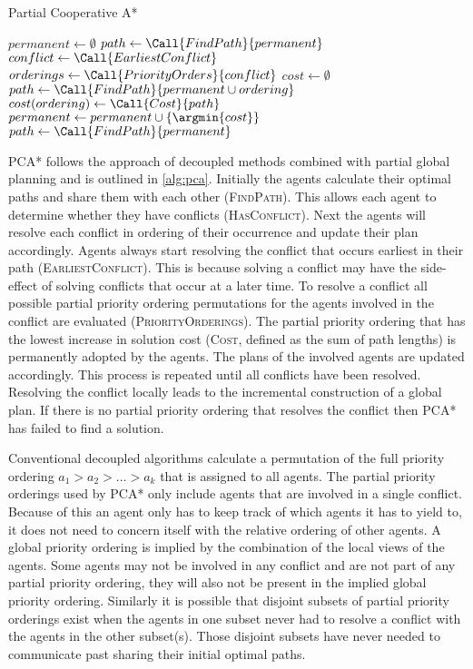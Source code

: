 \begin{algorithm}[t]
	\caption{Partial Cooperative A*}
	\label{alg:pca}
	\begin{algorithmic}[1]
		\State $permanent \gets \emptyset$
		\State $path \gets \Call{FindPath}{permanent}$
			\State $conflict \gets \Call{EarliestConflict}$
			\State $orderings \gets \Call{PriorityOrders}{conflict}$ 
			\State $cost \gets \emptyset$
				\State $path \gets \Call{FindPath}{permanent \cup ordering}$
				\State $cost(ordering) \gets \Call{Cost}{path}$
			\EndFor
			\State $permanent \gets permanent \cup \{ \argmin{cost} \}$
			\State $path \gets \Call{FindPath}{permanent}$
		\EndWhile
	\end{algorithmic}
\end{algorithm}

PCA* follows the approach of decoupled methods combined with partial 
global planning and is outlined in \autoref{alg:pca}. Initially the agents 
calculate their optimal paths and share them with each other (\textsc{FindPath}). This allows
each agent to determine whether they have conflicts (\textsc{HasConflict}). Next the
agents will resolve each conflict in ordering of their occurrence and update 
their 
plan accordingly. Agents always start resolving the conflict that occurs earliest in their path (\textsc{EarliestConflict}). This is because solving a conflict may have the 
side-effect of solving conflicts that occur at a later time. To resolve a 
conflict all possible partial priority ordering permutations for the agents 
involved in the conflict are evaluated (\textsc{PriorityOrderings}). The partial priority ordering that has 
the 
lowest increase in solution cost (\textsc{Cost}, defined as the sum of path lengths) is permanently adopted 
by the agents. The plans of the involved agents are updated accordingly. This 
process is repeated until all conflicts have been resolved. Resolving the 
conflict locally leads to the incremental construction of a global plan. If 
there is no partial priority ordering that resolves the conflict then PCA* has 
failed to find a solution.

Conventional decoupled algorithms calculate a permutation of the full priority 
ordering $a_1 > a_2 > \ldots > a_k$ that is assigned to all agents. The partial 
priority orderings used by PCA* only include agents that are involved in a 
single conflict. Because of this an agent only has to keep track of which 
agents it has to yield to, it does not need to concern itself with the 
relative ordering of other agents. A global priority ordering is implied by the 
combination of the local views of the agents. Some agents may not be involved 
in any conflict and are not part of any partial priority ordering, 
they will also not be present in the implied global priority ordering. 
Similarly 
it is possible that disjoint subsets of partial priority orderings exist when 
the 
agents in one subset never had to resolve a conflict with the agents in the 
other subset(s). Those disjoint subsets have never needed to communicate past 
sharing their initial optimal paths.

